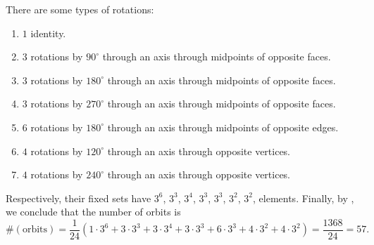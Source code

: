 There are some types of rotations:
\begin{enumerate}[label = \textbullet]
  \item \(1\) identity.
  \item \(3\) rotations by \(90^\circ\) through an axis through midpoints of opposite faces.
  \item \(3\) rotations by \(180^\circ\) through an axis through midpoints of opposite faces.
  \item \(3\) rotations by \(270^\circ\) through an axis through midpoints of opposite faces.
  \item \(6\) rotations by \(180^\circ\) through an axis through midpoints of opposite edges.
  \item \(4\) rotations by \(120^\circ\) through an axis through opposite vertices.
  \item \(4\) rotations by \(240^\circ\) through an axis through opposite vertices.
\end{enumerate}

Respectively, their fixed sets have \(3^6\), \(3^3\), \(3^4\), \(3^3\), \(3^3\), \(3^2\), \(3^2\), elements.
Finally, by , we conclude that the number of orbits is \[
  \#(\text{orbits}) = \frac{1}{24} \left(
    1 \cdot 3^6 +
    3 \cdot 3^3 +
    3 \cdot 3^4 +
    3 \cdot 3^3 +
    6 \cdot 3^3 +
    4 \cdot 3^2 +
    4 \cdot 3^2\right)
    = \frac{1368}{24} = 57.
\] 


